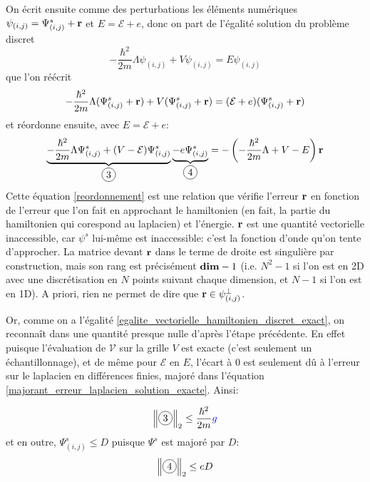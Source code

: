 \documentclass[svgnames,dvipsnames,a4paper,10pt,french]{report}
\newcommand*\circled[1]{\tikz[baseline=(char.base)]{\node[shape=circle,draw,inner sep=2pt] (char) {#1};}}
\begin{document}
\begin{appendices}
On écrit ensuite comme des perturbations les éléments numériques $\psi_{(i,j)} = \Psi^s_{(i,j)} + \mathbf{r}$ et  $E = \mathcal{E} + e$, donc on part de l'égalité solution du problème discret
\begin{equation}
    -\frac{\hbar^2}{2m}\Lambda\psi_{(i,j)} + V \psi_{(i,j)} = E \psi_{(i,j)}
\end{equation}
que l'on réécrit
\begin{equation}
    -\frac{\hbar^2}{2m}\Lambda (\Psi^s_{(i,j)} + \mathbf{r}) + V(\Psi^s_{(i,j)} + \mathbf{r}) = (\mathcal{E}+e)(\Psi^s_{(i,j)} + \mathbf{r}) 
\end{equation}
et réordonne ensuite, avec $E=\mathcal{E}+e$:
\begin{equation}
\label{reordonnement}
    \underbrace{-\frac{\hbar^2}{2m}\Lambda \Psi^s_{(i,j)}  + (V-\mathcal{E})\Psi^s_{(i,j)}}_{\circled{3}} \underbrace{- e \Psi^s_{(i,j)}}_{\circled{4}}  = -\left(-\frac{\hbar^2}{2m}\Lambda +V - E \right)\vect{r} 
\end{equation}
 Cette équation \ref{reordonnement} est une relation que vérifie l'erreur $\mathbf{r}$ en fonction de l'erreur que l'on fait en approchant le hamiltonien (en fait, la partie du hamiltonien qui corespond au laplacien) et l'énergie. $\mathbf{r}$ est une quantité vectorielle inaccessible, car $\psi^s$ lui-même est inaccessible: c'est la fonction d'onde qu'on tente d'approcher. La matrice devant $\mathbf{r}$ dans le terme de droite est singulière par construction, mais son rang est précisément $\mathbf{dim}-1$ (i.e. $N^2-1$ si l'on est en 2D avec une discrétisation en $N$ points suivant chaque dimension, et $N-1$ si l'on est en 1D). A priori, rien ne permet de dire que $\mathbf{r} \in \psi_{(i,j)}^\perp$.

Or, comme on a l'égalité \ref{egalite_vectorielle_hamiltonien_discret_exact}, on reconnaît dans \circled{3} une quantité presque nulle d'après l'étape précédente. En effet puisque l'évaluation de $\mathcal{V}$ sur la grille $V$ est exacte (c'est seulement un échantillonnage), et de même pour $\mathcal{E}$ en $E$, l'écart à 0 est seulement dû à l'erreur sur le laplacien en différences finies, majoré dans l'équation  \ref{majorant_erreur_laplacien_solution_exacte}. Ainsi:

\begin{equation}
    \left\| \circled{3} \right\|_2 \le \frac{\hbar^2}{2m} \textcolor{blue}{g}
\end{equation}
et en outre, $\Psi^s_{(i,j)} \le D$ puisque $\Psi^s$ est majoré par $D$:
\begin{equation}
    \left\|\circled{4} \right\|_2 \le eD
\end{equation}


\end{appendices}
\end{document}
